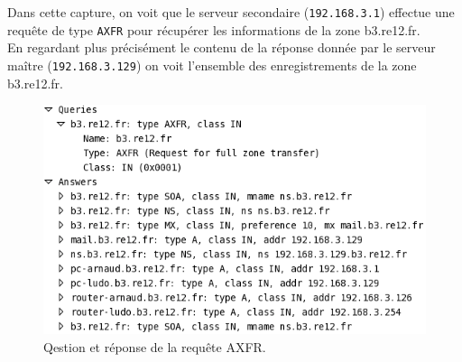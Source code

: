 \documentclass[12pt,a4paper,notitlepage]{article}
\begin{document}
Dans cette capture, on voit que le serveur secondaire (\texttt{192.168.3.1}) effectue une requête de type \texttt{AXFR} pour récupérer les informations de la  zone b3.re12.fr.\\

En regardant plus précisément le contenu de la réponse donnée par le serveur maître (\texttt{192.168.3.129}) on voit l'ensemble des enregistrements de la zone b3.re12.fr.
\begin{figure}[!h]
\begin{center}
\includegraphics[scale=0.55]{axfr}
\caption{Qestion et réponse de la requête AXFR.}
\label{fig:da}
\end{center}
\end{figure}
\end{document}
